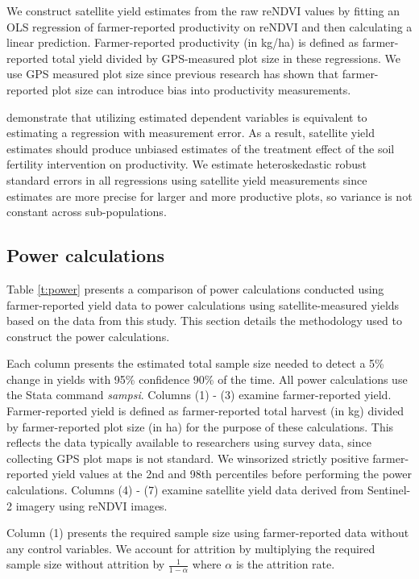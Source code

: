 \documentclass{article}
\begin{document}
We construct satellite yield estimates from the raw reNDVI values by fitting an OLS regression of farmer-reported productivity on reNDVI and then calculating a linear prediction. Farmer-reported productivity (in kg/ha) is defined as farmer-reported total yield divided by GPS-measured plot size in these regressions. We use GPS measured plot size since previous research has shown that farmer-reported plot size can introduce bias into productivity measurements. 

\citet{Lewis2005EstimatingEstimates} demonstrate that utilizing estimated dependent variables is equivalent to estimating a regression with measurement error. As a result, satellite yield estimates should produce unbiased estimates of the treatment effect of the soil fertility intervention on productivity. We estimate heteroskedastic robust standard errors in all regressions using satellite yield measurements since estimates are more precise for larger and more productive plots, so variance is not constant across sub-populations. 


\subsection{Power calculations}

Table \ref{t:power} presents a comparison of power calculations conducted using farmer-reported yield data to power calculations using satellite-measured yields based on the data from this study. This section details the methodology used to construct the power calculations. 

Each column presents the estimated total sample size needed to detect a 5\% change in yields with 95\% confidence 90\% of the time. All power calculations use the Stata command \textit{sampsi}. Columns (1) - (3) examine farmer-reported yield. Farmer-reported yield is defined as farmer-reported total harvest (in kg) divided by farmer-reported plot size (in ha) for the purpose of these calculations. This reflects the data typically available to researchers using survey data, since collecting GPS plot maps is not standard. We winsorized strictly positive farmer-reported yield values at the 2nd and 98th percentiles before performing the power calculations. Columns (4) - (7) examine satellite yield data derived from Sentinel-2 imagery using reNDVI images.

Column (1) presents the required sample size using farmer-reported data without any control variables. We account for attrition by multiplying the required sample size without attrition by $\frac{1}{1-\alpha}$ where $\alpha$ is the attrition rate. 
\end{document}
